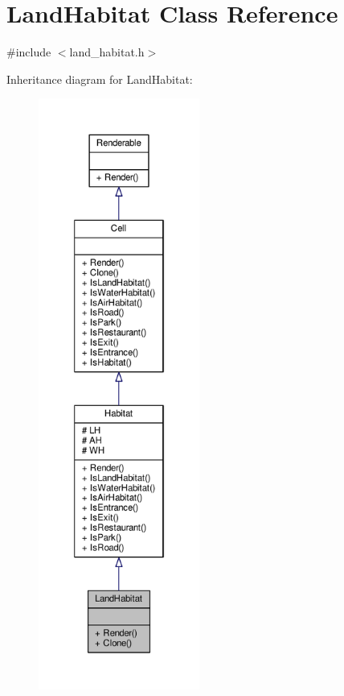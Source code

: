 \hypertarget{classLandHabitat}{}\section{Land\+Habitat Class Reference}
\label{classLandHabitat}


{\ttfamily \#include $<$land\+\_\+habitat.\+h$>$}



Inheritance diagram for Land\+Habitat\+:
\nopagebreak
\begin{figure}[H]
\begin{center}
\leavevmode
\includegraphics[height=550pt]{classLandHabitat__inherit__graph}
\end{center}
\end{figure}


